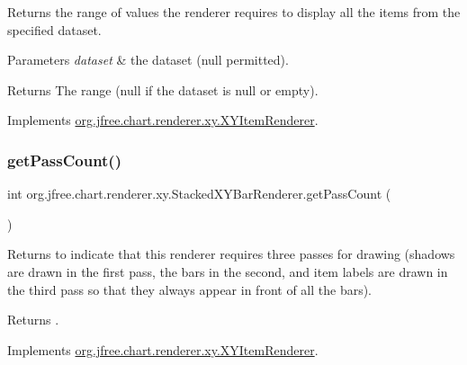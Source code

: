 Returns the range of values the renderer requires to display all the items from the specified dataset.


\begin{DoxyParams}{Parameters}
{\em dataset} & the dataset ({\ttfamily null} permitted).\\
\hline
\end{DoxyParams}
\begin{DoxyReturn}{Returns}
The range ({\ttfamily null} if the dataset is {\ttfamily null} or empty). 
\end{DoxyReturn}


Implements \mbox{\hyperlink{interfaceorg_1_1jfree_1_1chart_1_1renderer_1_1xy_1_1_x_y_item_renderer_af9ac6f440e99c73d343de7851e89496a}{org.\+jfree.\+chart.\+renderer.\+xy.\+X\+Y\+Item\+Renderer}}.

\mbox{\label{classorg_1_1jfree_1_1chart_1_1renderer_1_1xy_1_1_stacked_x_y_bar_renderer_aa9ed2c3310400d9da9a9e3e2c7f719f1}} 
\subsubsection{\texorpdfstring{get\+Pass\+Count()}{getPassCount()}}
{\footnotesize\ttfamily int org.\+jfree.\+chart.\+renderer.\+xy.\+Stacked\+X\+Y\+Bar\+Renderer.\+get\+Pass\+Count (\begin{DoxyParamCaption}{ }\end{DoxyParamCaption})}

Returns {} to indicate that this renderer requires three passes for drawing (shadows are drawn in the first pass, the bars in the second, and item labels are drawn in the third pass so that they always appear in front of all the bars).

\begin{DoxyReturn}{Returns}
{}. 
\end{DoxyReturn}


Implements \mbox{\hyperlink{interfaceorg_1_1jfree_1_1chart_1_1renderer_1_1xy_1_1_x_y_item_renderer_afe42489776da2a4c7e64838382bbaea1}{org.\+jfree.\+chart.\+renderer.\+xy.\+X\+Y\+Item\+Renderer}}.

